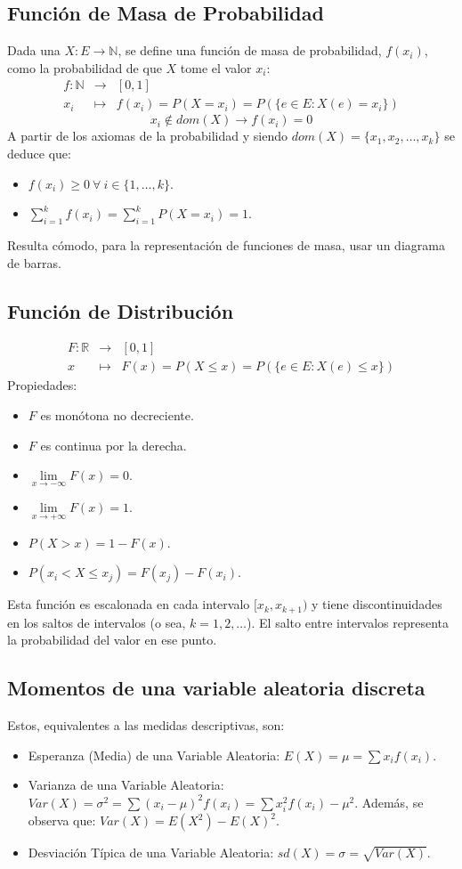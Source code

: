 \documentclass[10pt,a4paper]{book}
\begin{document}
\subsection{Función de Masa de Probabilidad}
Dada una $X : E\to\mathbb{N}$, se define una función de masa de probabilidad, $f(x_i)$, como la probabilidad de que $X$ tome el valor $x_i$:
\[\begin{array}{rcl}
	f:\mathbb{N} & \longrightarrow & [0,1]\\
	x_i & \longmapsto & f(x_i) = P(X = x_i) = P(\{e\in E : X(e) = x_i\})
\end{array}\]
\[x_i\notin dom(X) \longrightarrow f(x_i) = 0\]
A partir de los axiomas de la probabilidad y siendo $dom(X)=\{x_1, x_2, \dots,x_k\}$ se deduce que:
\begin{itemize}
	\item $f(x_i) \geq 0\:\forall\:i\in\{1,\dots,k\}$.
	\item $\sum\limits_{i=1}^k f(x_i) = \sum\limits_{i=1}^k P(X = x_i) = 1$.
\end{itemize}
Resulta cómodo, para la representación de funciones de masa, usar un diagrama de barras.

\subsection{Función de Distribución}
\[\begin{array}{rcl}
	F:\mathbb{R} & \longrightarrow & [0,1] \\
	x & \longmapsto & F(x) = P(X \leq x) =P(\{ e\in E : X(e)\leq x \})
\end{array}\]
Propiedades:
\begin{itemize}
	\item $F$ es monótona no decreciente.
	\item $F$ es continua por la derecha.
	\item $\lim\limits_{x\to -\infty}F(x)=0$.
	\item $\lim\limits_{x\to +\infty}F(x)=1$.
	\item $P(X>x) = 1-F(x)$.
	\item $P(x_i<X\leq x_j) = F(x_j)-F(x_i)$.
\end{itemize}
Esta función es escalonada en cada intervalo $[x_k, x_{k+1})$ y tiene discontinuidades en los saltos de intervalos (o sea, $k=1,2,\dots$). El salto entre intervalos representa la probabilidad del valor en ese punto.

\subsection{Momentos de una variable aleatoria discreta}
Estos, equivalentes a las medidas descriptivas, son:
\begin{itemize}
	\item Esperanza (Media) de una Variable Aleatoria: $E(X) = \mu = \sum x_if(x_i)$.
	\item Varianza de una Variable Aleatoria: $Var(X) = \sigma^2 = \sum (x_i-\mu)^2f(x_i) = \sum x_i^2f(x_i)-\mu^2$. Además, se observa que: $Var(X) = E(X^2)-E(X)^2$.
	\item Desviación Típica de una Variable Aleatoria: $sd(X)= \sigma =\sqrt{Var(X)}$.
\end{itemize}
\end{document}
